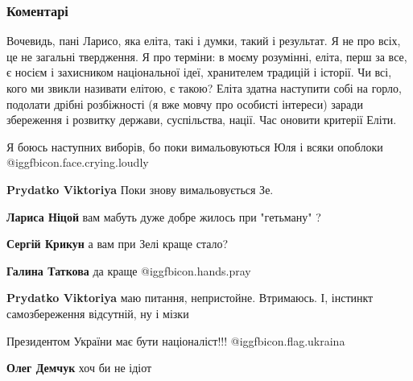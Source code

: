  
 
 
 
 
\subsubsection{Коментарі}
\label{sec:26_11_2021.fb.nicoj_larisa.1.zelenskii_press_konferencia.cmt}

\begin{itemize} %

Вочевидь, пані Ларисо, яка еліта, такі і думки, такий і результат. Я не про
всіх, це не загальні твердження. Я про терміни: в моєму розумінні, еліта, перш
за все, є носієм і захисником національної ідеї, хранителем традицій і історії.
Чи всі, кого ми звикли називати елітою, є такою? Еліта здатна наступити собі на
горло, подолати дрібні розбіжності (я вже мовчу про особисті інтереси) заради
збереження і розвитку держави, суспільства, нації. Час оновити критерії Еліти.

Я боюсь наступних виборів, бо поки вимальовуються Юля і всяки опоблоки  @igg{fbicon.face.crying.loudly} 

\begin{itemize} %
\textbf{Prydatko Viktoriya} Поки знову вимальовується Зе.

\textbf{Лариса Ніцой} вам мабуть дуже добре жилось при "гетьману" ?

\textbf{Сергій Крикун} а вам при Зелі краще стало?

\textbf{Галина Таткова} да краще  @igg{fbicon.hands.pray} 

\textbf{Prydatko Viktoriya} маю питання, непристойне. Втримаюсь. І, інстинкт самозбереження відсутній, ну і мізки
\end{itemize} %

Президентом України має бути націоналіст!!! @igg{fbicon.flag.ukraina}

\begin{itemize} %
\textbf{Олег Демчук} хоч би не ідіот


\end{itemize}
\end{itemize}
